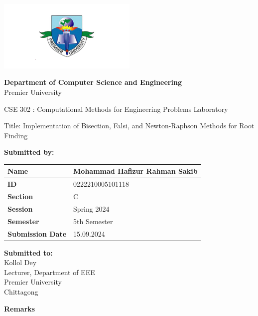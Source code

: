 \documentclass{scrreprt}
\renewcommand{\arraystretch}{1.5}
\begin{document}
\begin{titlepage}
    \centering
    \includegraphics[width=0.5\textwidth]{./logo.png} 
    \vspace{1cm}

    \textbf{Department of Computer Science and Engineering}\\
    Premier University
    \vspace{1cm}

     \Large \textnormal{CSE 302 : Computational Methods for Engineering 
    Problems Laboratory }
    \vspace{1in} 

    \Large \textnormal{Title: Implementation of Bisection, Falsi, and Newton-Raphson Methods for Root Finding}
    \vspace{0.5in} 

    \large
    \textbf{Submitted by:}
    \vspace{0.5cm}

    \renewcommand{\arraystretch}{1.5} 
    \begin{tabular}{|p{}|p{}|}
        \hline
        \textbf{Name} & Mohammad Hafizur Rahman Sakib \\ 
        \hline
        \textbf{ID} & 0222210005101118 \\ 
        \hline
        \textbf{Section} & C \\ 
        \hline
        \textbf{Session} & Spring 2024 \\ 
        \hline
        \textbf{Semester} & 5th Semester \\ 
        \hline
        \textbf{Submission Date} & 15.09.2024 \\ 
        \hline
    \end{tabular}
    \vspace{1cm}

    \begin{minipage}[t]{0.48\textwidth}
        \textbf{Submitted to:}\\
        Kollol Dey\\
        Lecturer, Department of EEE\\
        Premier University\\
        Chittagong
    \end{minipage}%
    \hfill 
    \begin{minipage}[t]{0.48\textwidth}
        \raggedleft
        \textbf{Remarks}\\
        \vspace{0.5cm} %
    \end{minipage}


\end{titlepage}
\end{document}
